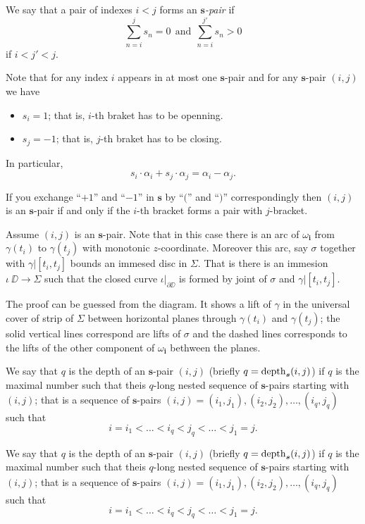 \documentclass[a4paper,10pt]{amsart}
\begin{document}
We say that a pair of indexes $i<j$
forms an \emph{$\bm{s}$-pair} 
if 
\[
\sum_{n=i}^js_n=0\ \ 
\text{and}\ \ 
\sum_{n=i}^{j'}s_n>0
\]
if $i<j'<j$.

Note that for any index $i$ appears in at most one $\bm{s}$-pair and 
for any $\bm{s}$-pair $(i,j)$ we have
\begin{itemize}
\item $s_i=1$; that is, $i$-th braket has to be openning.
 \item $s_j=-1$; that is, $j$-th braket has to be closing.
\end{itemize}
In particular,
\[s_i\cdot\alpha_i+s_j\cdot\alpha_j=\alpha_i-\alpha_j.\]

If you exchange ``$+1$'' and ``$-1$'' in $\bm{s}$ by ``$($'' and ``$)$'' correspondingly then $(i,j)$ is an $\bm{s}$-pair
if and only if the $i$-th bracket forms a pair with $j$-bracket.

\parbf{Embedded disc interpretation.}
Assume $(i,j)$ is an $\bm{s}$-pair.
Note that in this case there is an arc of $\omega_{\bm{i}}$
from $\gamma(t_i)$ to $\gamma(t_j)$
with monotonic $z$-coordinate.
Moreover this arc, say $\sigma$ together with $\gamma|{[t_i,t_j]}$ bounds an immesed disc in $\Sigma$.
That is there is an immesion $\iota\:\DD\to\Sigma$ 
such that the closed curve $\iota|_{\partial \DD}$ is formed by joint of $\sigma$ and $\gamma|{[t_i,t_j]}$.

The proof can be guessed from the diagram.
It shows a lift of $\gamma$ in the universal cover of strip of $\Sigma$ between horizontal planes through $\gamma(t_i)$ and $\gamma(t_j)$;
the solid vertical lines correspond are lifts of $\sigma$ and the dashed lines corresponds to the lifts of the other component of $\omega_{\bm{i}}$ bethween the planes.

We say that $q$ is the depth of an $\bm{s}$-pair $(i,j)$
(briefly $q=\mathop{\rm depth}\nolimits_{\bm{s}}(i,j)$) 
if $q$ is the maximal number such that theis $q$-long nested sequence of $\bm{s}$-pairs starting with $(i,j)$; 
that is a sequence of $\bm{s}$-pairs
$(i,j)=(i_1,j_1),(i_2,j_2),\dots,(i_q,j_q)$ such that
\[i=i_1<\dots<i_q<j_q<\dots<j_1=j.\]

We say that $q$ is the depth of an $\bm{s}$-pair $(i,j)$
(briefly $q=\mathop{\rm depth}\nolimits_{\bm{s}}(i,j)$) 
if $q$ is the maximal number such that theis $q$-long nested sequence of $\bm{s}$-pairs starting with $(i,j)$; 
that is a sequence of $\bm{s}$-pairs
$(i,j)=(i_1,j_1),(i_2,j_2),\dots,(i_q,j_q)$ such that
\[i=i_1<\dots<i_q<j_q<\dots<j_1=j.\]
\end{document}
